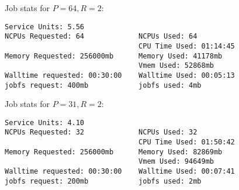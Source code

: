 \documentclass[11pt]{report}
\begin{document}
Job stats for $P=64, R=2$:

\begin{verbatim}
Service Units: 5.56
NCPUs Requested: 64             NCPUs Used: 64
                                CPU Time Used: 01:14:45
Memory Requested: 256000mb      Memory Used: 41178mb
                                Vmem Used: 52868mb
Walltime requested: 00:30:00    Walltime Used: 00:05:13
jobfs request: 400mb            jobfs used: 4mb
\end{verbatim}

Job stats for $P=31, R=2$:

\begin{verbatim}
Service Units: 4.10
NCPUs Requested: 32             NCPUs Used: 32
                                CPU Time Used: 01:50:42
Memory Requested: 256000mb      Memory Used: 82869mb
                                Vmem Used: 94649mb
Walltime requested: 00:30:00    Walltime Used: 00:07:41
jobfs request: 200mb            jobfs used: 2mb
\end{verbatim}



%
\end{document}
